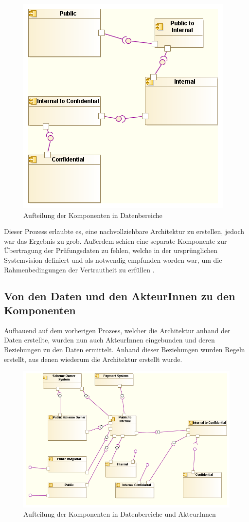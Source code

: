 \begin{figure}[!htbp]
    \centering
    \includegraphics[scale=0.7]{uml/vision3.png}
    \caption{Aufteilung der Komponenten in Datenbereiche}
\end{figure}

Dieser Prozess erlaubte es, eine nachvollziehbare Architektur zu erstellen, jedoch war das Ergebnis zu grob. Außerdem schien eine separate Komponente zur  Übertragung der Prüfungsdaten zu fehlen, welche in der ursprünglichen Systemvision definiert und als notwendig empfunden worden war, um die Rahmenbedingungen der Vertrautheit zu erfüllen \cite[7.3]{ISO_CERT}.

\subsection{Von den Daten und den AkteurInnen zu den Komponenten}
Aufbauend auf dem vorherigen Prozess, welcher die Architektur anhand der Daten erstellte, wurden nun auch AkteurInnen eingebunden und deren Beziehungen zu den Daten ermittelt. Anhand dieser Beziehungen wurden Regeln erstellt, aus denen wiederum die Architektur erstellt wurde.

\begin{figure}[!htbp]
    \centering
    \includegraphics[scale=0.55]{uml/vision4.png}
    \caption{Aufteilung der Komponenten in Datenbereiche und AkteurInnen}
\end{figure}

